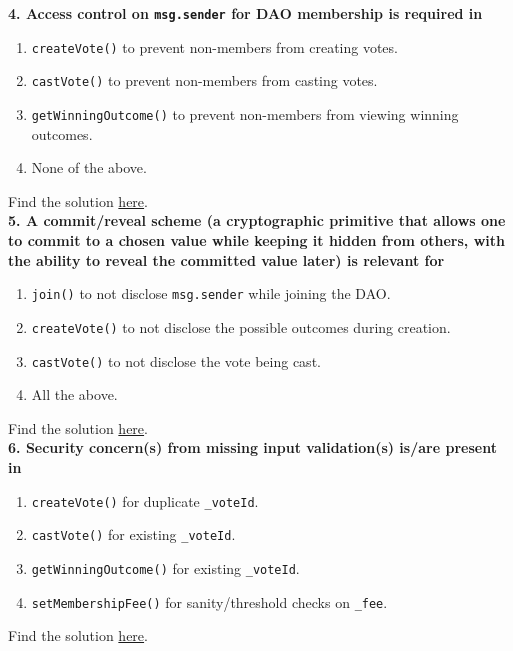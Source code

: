 \textbf{4. Access control on \texttt{msg.sender} for DAO membership is required in}

\begin{enumerate}[label=\Alph*.]
    \item \verb|createVote()| to prevent non-members from creating votes.
    \item \verb|castVote()| to prevent non-members from casting votes.
    \item \verb|getWinningOutcome()| to prevent non-members from viewing winning outcomes.
    \item None of the above.
\end{enumerate}

Find the solution \hyperref[sec:exam7_q4]{here}.\\

\textbf{5. A commit/reveal scheme (a cryptographic primitive that allows one to commit to a chosen value while keeping it hidden from others, with the ability to reveal the committed value later) is relevant for}

\begin{enumerate}[label=\Alph*.]
    \item \verb|join()| to not disclose \verb|msg.sender| while joining the DAO.
    \item \verb|createVote()| to not disclose the possible outcomes during creation.
    \item \verb|castVote()| to not disclose the vote being cast.
    \item All the above.
\end{enumerate}

Find the solution \hyperref[sec:exam7_q5]{here}.\\

\textbf{6. Security concern(s) from missing input validation(s) is/are present in}

\begin{enumerate}[label=\Alph*.]
    \item \verb|createVote()| for duplicate \verb|_voteId|.
    \item \verb|castVote()| for existing \verb|_voteId|.
    \item \verb|getWinningOutcome()| for existing \verb|_voteId|.
    \item \verb|setMembershipFee()| for sanity/threshold checks on \verb|_fee|.
\end{enumerate}

Find the solution \hyperref[sec:exam7_q6]{here}.\\

